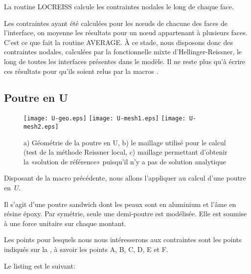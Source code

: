 \medskip
La routine LOCREISS calcule les contraintes nodales le long de chaque face.

\medskip
Les contraintes ayant été calculées pour les nœuds de chacune des faces de l'interface, on moyenne les résultats pour un nœud appartenant à plusieurs faces. C'est ce que fait la routine AVERAGE. À ce stade, nous disposons donc des contraintes nodales, calculées par la fonctionnelle mixte d'Hellinger-Reissner, le long de toutes les interfaces présentes dans le modèle. Il ne reste plus qu'à écrire ces résultats pour qu'ils soient relus par la macros \ansys.




\medskip
\subsection{Poutre en U}

\begin{figure}[ht]
  \texttt{[image: U-geo.eps]} \hfill
  \texttt{[image: U-mesh1.eps]}\hfill
  \texttt{[image: U-mesh2.eps]}
  \caption{\label{Fig-poutU-geo} a) Géométrie de la poutre en U, b) le maillage utilisé pour le calcul (test de la méthode Reissner local,
c) maillage permettant d'obtenir la «solution de référence» puisqu'il n'y a pas de solution analytique}
\end{figure}

Disposant de la macro précédente, nous allons l'appliquer au calcul d'une poutre en~$U$.

Il s'agit d'une poutre sandwich dont les peaux sont en aluminium et l'âme en résine époxy. Par symétrie, seule une demi-poutre est modélisée. Elle est soumise à une force unitaire sur chaque montant.

\medskip
Les points pour lesquels nous nous intéresserons aux contraintes sont les points indiqués sur la , à savoir les points A, B, C, D, E et F.



\medskip
Le listing \ansys est le suivant:

